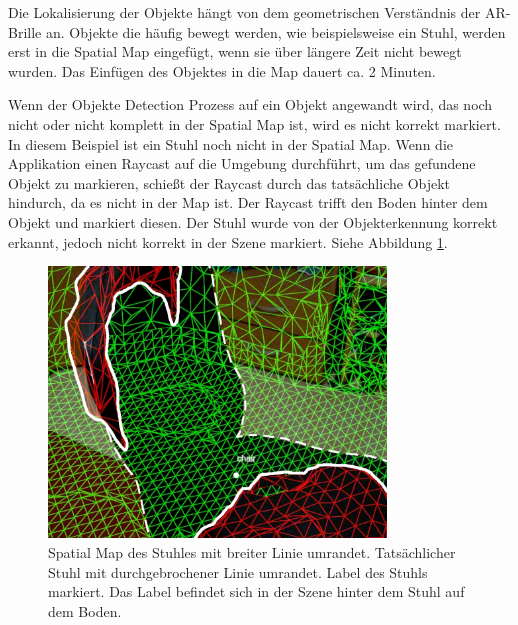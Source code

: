 %

Die Lokalisierung der Objekte hängt von dem geometrischen Verständnis der AR-Brille an. Objekte die häufig bewegt werden, wie beispielsweise ein Stuhl, werden erst in die Spatial Map eingefügt, wenn sie über längere Zeit nicht bewegt wurden. Das Einfügen des Objektes in die Map dauert ca. 2 Minuten. 

Wenn der Objekte Detection Prozess auf ein Objekt angewandt wird, das noch nicht oder nicht komplett in der Spatial Map ist, wird es nicht korrekt markiert. In diesem Beispiel ist ein Stuhl noch nicht in der Spatial Map. Wenn die Applikation einen Raycast auf die Umgebung durchführt, um das gefundene Objekt zu markieren, schießt der Raycast durch das tatsächliche Objekt hindurch, da es  nicht in der Map ist. Der Raycast trifft den Boden hinter dem Objekt und markiert diesen. Der Stuhl wurde von der Objekterkennung korrekt erkannt, jedoch nicht korrekt in der Szene markiert. Siehe Abbildung \ref{img:stuhl}. 

\begin{figure}[H]
	\centering
	\includegraphics[width=0.8\textwidth]{images/ML_20201004_19.18.02_sup.jpg}
	\caption[Label  setzten, bei fehlerhafter Spatial Map]{Spatial Map des Stuhles mit breiter Linie umrandet. Tatsächlicher Stuhl mit durchgebrochener Linie umrandet. Label des Stuhls markiert. Das Label befindet sich in der Szene hinter dem Stuhl auf dem Boden.}
	\label{img:stuhl}
\end{figure}

